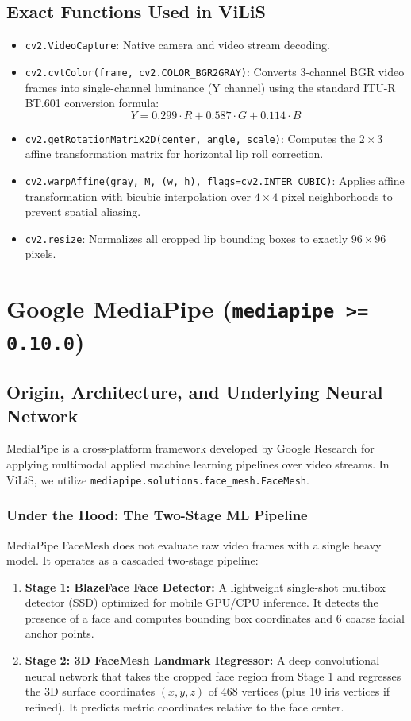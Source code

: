 \documentclass[11pt,a4paper]{report}
\begin{document}
\subsection{Exact Functions Used in ViLiS}
\begin{itemize}
    \item \texttt{cv2.VideoCapture}: Native camera and video stream decoding.
    \item \texttt{cv2.cvtColor(frame, cv2.COLOR\_BGR2GRAY)}: Converts 3-channel BGR video frames into single-channel luminance (Y channel) using the standard ITU-R BT.601 conversion formula:
    $$Y = 0.299 \cdot R + 0.587 \cdot G + 0.114 \cdot B$$
    \item \texttt{cv2.getRotationMatrix2D(center, angle, scale)}: Computes the $2 \times 3$ affine transformation matrix for horizontal lip roll correction.
    \item \texttt{cv2.warpAffine(gray, M, (w, h), flags=cv2.INTER\_CUBIC)}: Applies affine transformation with bicubic interpolation over $4 \times 4$ pixel neighborhoods to prevent spatial aliasing.
    \item \texttt{cv2.resize}: Normalizes all cropped lip bounding boxes to exactly $96 \times 96$ pixels.
\end{itemize}

\section{Google MediaPipe (\texttt{mediapipe >= 0.10.0})}
\subsection{Origin, Architecture, and Underlying Neural Network}
MediaPipe is a cross-platform framework developed by Google Research for applying multimodal applied machine learning pipelines over video streams.
In ViLiS, we utilize \texttt{mediapipe.solutions.face\_mesh.FaceMesh}.
\subsubsection{Under the Hood: The Two-Stage ML Pipeline}
MediaPipe FaceMesh does not evaluate raw video frames with a single heavy model. It operates as a cascaded two-stage pipeline:
\begin{enumerate}
    \item \textbf{Stage 1: BlazeFace Face Detector:} A lightweight single-shot multibox detector (SSD) optimized for mobile GPU/CPU inference. It detects the presence of a face and computes bounding box coordinates and 6 coarse facial anchor points.
    \item \textbf{Stage 2: 3D FaceMesh Landmark Regressor:} A deep convolutional neural network that takes the cropped face region from Stage 1 and regresses the 3D surface coordinates $(x, y, z)$ of 468 vertices (plus 10 iris vertices if refined). It predicts metric coordinates relative to the face center.
\end{enumerate}
\end{document}

